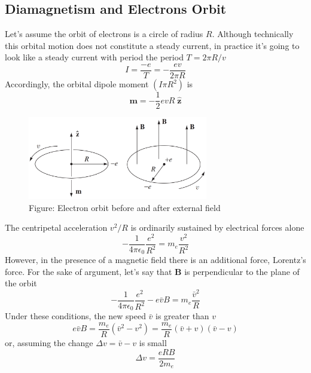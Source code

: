 \documentclass[../../../main.tex]{subfiles}
\begin{document}
\subsection*{Diamagnetism and Electrons Orbit}
Let’s assume the  orbit of electrons is a circle of radius $R$. Although technically this orbital motion does not constitute a steady current, in practice it's going to look like a steady current with period the period $T = 2\pi R/v$
\begin{equation*}
    I=\frac{-e}{T}=-\frac{ev}{2\pi R}
\end{equation*}
Accordingly, the orbital dipole moment $(I \pi R^2)$ is
\begin{equation*}
    \mathbf{m}=-\frac{1}{2}evR \;\mathbf{\hat{z}}
\end{equation*}

\begin{figure}[b]
    \centering
    \includegraphics[width=0.7\textwidth]{../Rss/Electromagnetism/FieldInsideMatter/EOrbit.png}
    \caption*{Figure: Electron orbit before and after external field}
\end{figure}

The centripetal acceleration $v^2/R$ is ordinarily sustained by electrical forces alone
\begin{equation*}
    -\frac{1}{4\pi \epsilon_0}\frac{e^2}{R^2}=m_e\frac{v^2}{R^2}
\end{equation*}
However, in the presence of a magnetic ﬁeld there is an additional force, Lorentz's force. For the sake of argument, let's say that \textbf{B} is perpendicular to the plane of the orbit
\begin{equation*}
    -\frac{1}{4\pi \epsilon_0}\frac{e^2}{R^2}-e\bar{v}B=m_e\frac{\bar{v}^2}{R}
\end{equation*}
Under these conditions, the new speed $\bar{v}$ is greater than $v$
\begin{equation*}
    e\bar{v}B=\frac{m_e}{R}(\bar{v}^2-v^2)=\frac{m_e}{R}(\bar{v}+v)(\bar{v}-v)
\end{equation*}
or, assuming the change $\Delta v =\bar{v} - v$ is small
\begin{equation*}
    \Delta v =\frac{eRB}{2m_e}
\end{equation*}
\end{document}

